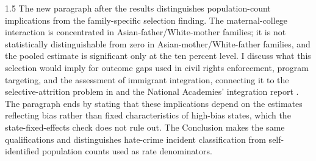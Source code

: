 \documentclass[12pt,english]{article}
\newcommand{\rrxspc}{1.5}
\begin{document}
\begin{refsection}
\begin{spacing}{\rrxspc}
        The new paragraph after the results distinguishes population-count implications from the family-specific selection finding. The maternal-college interaction is concentrated in Asian-father/White-mother families; it is not statistically distinguishable from zero in Asian-mother/White-father families, and the pooled estimate is significant only at the ten percent level. I discuss what this selection would imply for outcome gaps used in civil rights enforcement, program targeting, and the assessment of immigrant integration, connecting it to the selective-attrition problem in \textcite{duncanIdentifyingLaterGenerationDescendants2018} and the National Academies' integration report \autocite{watersIntegrationImmigrantsAmerican2015}. The paragraph ends by stating that these implications depend on the estimates reflecting bias rather than fixed characteristics of high-bias states, which the state-fixed-effects check does not rule out. The Conclusion makes the same qualifications and distinguishes hate-crime incident classification from self-identified population counts used as rate denominators.
    \end{spacing}


\end{refsection}
\end{document}
